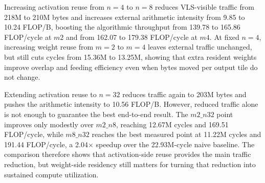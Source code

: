 \begin{table}[ht]
\centering
\small
\caption{Measured policy comparison. The naive row uses the tiled baseline from this evaluation; the $m8\_n32$ point uses the measured queue-size-4 run from the scratchpad-frontend queue sweep.}
\label{tab:reuse-policy-comparison}
\end{table}

Increasing activation reuse from $n=4$ to $n=8$ reduces VLS-visible traffic from 218M to 210M bytes and increases external arithmetic intensity from 9.85 to 10.24 FLOP/B, boosting the algorithmic throughput from 139.78 to 165.86 FLOP/cycle at $m2$ and from 162.07 to 179.38 FLOP/cycle at $m4$. At fixed $n=4$, increasing weight reuse from $m=2$ to $m=4$ leaves external traffic unchanged, but still cuts cycles from 15.36M to 13.25M, showing that extra resident weights improve overlap and feeding efficiency even when bytes moved per output tile do not change.

Extending activation reuse to $n=32$ reduces traffic again to 203M bytes and pushes the arithmetic intensity to 10.56 FLOP/B. However, reduced traffic alone is not enough to guarantee the best end-to-end result. The $m2\_n32$ point improves only modestly over $m2\_n8$, reaching 12.67M cycles and 169.51 FLOP/cycle, while $m8\_n32$ reaches the best measured point at 11.22M cycles and 191.44 FLOP/cycle, a 2.04$\times$ speedup over the 22.93M-cycle naive baseline. The comparison therefore shows that activation-side reuse provides the main traffic reduction, but weight-side residency still matters for turning that reduction into sustained compute utilization.

